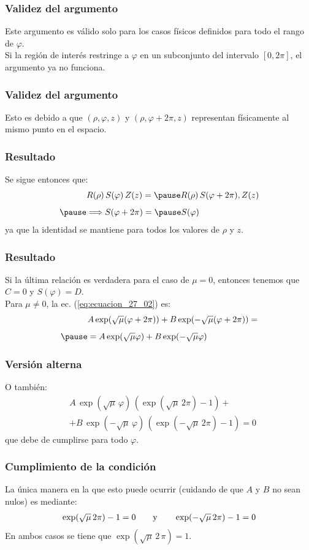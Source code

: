 \documentclass[12pt]{beamer}
\begin{document}
\begin{frame}
\frametitle{Validez del argumento}
Este argumento es válido solo para los casos físicos definidos para todo el rango de $\varphi$. 
\\
\bigskip
\pause
Si la región de interés restringe a $\varphi$ en un subconjunto del intervalo $[0, 2 \pi]$, el argumento ya no funciona.
\end{frame}
\begin{frame}
\frametitle{Validez del argumento}
Esto es debido a que $(\rho, \varphi, z)$ y $(\rho, \varphi + 2 \pi, z)$ representan físicamente al mismo punto en el espacio.
\end{frame}
\begin{frame}
\frametitle{Resultado}
Se sigue entonces que:
\pause
\begin{eqnarray*}
&R(\rho) \, S(\varphi) \, Z(z) = \pause R(\rho)  \, S(\varphi + 2 \pi) , Z(z) \\[0.5em] \pause
&\Longrightarrow S(\varphi + 2 \pi) = \pause S (\varphi)
\end{eqnarray*}
ya que la identidad se mantiene para todos los valores de $\rho$ y $z$.
\end{frame}
\begin{frame}
\frametitle{Resultado}
Si la última relación es verdadera para el caso de $\mu = 0$, \pause entonces tenemos que $C = 0$ y $S(\varphi) = D$.
\\
\bigskip
\pause
Para $\mu \neq 0$, la ec. (\ref{eq:ecuacion_27_02}) es:
\pause
\begin{eqnarray*}
&A \exp(\sqrt{\mu}(\varphi + 2 \pi)) + B \exp(- \sqrt{\mu}(\varphi + 2 \pi)) = \\[0.5em] \pause
&= A \exp(\sqrt{\mu} \varphi) + B \exp(-\sqrt{\mu} \varphi)
\end{eqnarray*}
\end{frame}
\begin{frame}
\frametitle{Versión alterna}
O también:
\pause
\begin{align*}
&A \, \exp(\sqrt{\mu} \, \varphi) \, (\exp(\sqrt{\mu} \, 2 \pi) - 1) + \\[0.5em]
&+ B \, \exp(- \sqrt{\mu} \, \varphi) \, (\exp(- \sqrt{\mu} \, 2 \pi) - 1) = 0
\end{align*}
\pause
que debe de cumplirse para todo $\varphi$.
\end{frame}
\begin{frame}
\frametitle{Cumplimiento de la condición}
La única manera en la que esto puede ocurrir (cuidando de que $A$ y $B$ no sean nulos) es mediante:
\pause
\begin{align*}
\exp(\sqrt{\mu} \, 2 \pi) - 1 = 0 \hspace{0.7cm} \mbox{y} \hspace{0.7cm} \exp(- \sqrt{\mu} \, 2 \pi) - 1 = 0
\end{align*}
\pause
En ambos casos se tiene que $\exp(\sqrt{\mu} \, 2 \, \pi) = 1$.
\end{frame}
\end{document}
